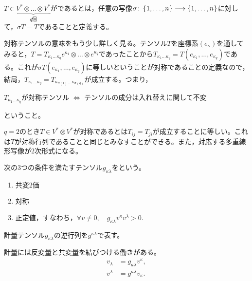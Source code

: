 \documentclass[uplatex]{jsarticle}
\begin{document}
\begin{teigi}[対称テンソル]
  $T \in \underbrace{V^{*} \otimes \dots \otimes V^{*}}_{q\text{個}}$がであるとは，任意の写像$\sigma \colon \Set{\hspace{-1.8pt} 1,\dots,n \hspace{-1.8pt}} \longrightarrow \Set{\hspace{-1.8pt} 1,\dots,n \hspace{-1.8pt}}$に対して，$\sigma T = T$であることと定義する。
\end{teigi}

対称テンソルの意味をもう少し詳しく見る。テンソル$T$を座標系$(e_{\kappa})$を通してみると，$T = T_{\kappa_{1} \dots \kappa_{q}} e^{\kappa_{1}} \otimes \dots \otimes e^{\kappa_{q}}$であったことから$T_{\kappa_{1} \dots \kappa_{q}} = T(e_{\kappa_{1}}, \dots, e_{\kappa_{q}})$である。これが$\sigma T (e_{\kappa_{1}}, \dots, e_{\kappa_{q}})$に等しいということが対称であることの定義なので，結局，$T_{\kappa_{1} \dots \kappa_{q}} = T_{\kappa_{\sigma(1)}\dots \kappa_{\sigma(q)}}$が成立する。つまり，
\begin{center}
  $T_{\kappa_{1}\dots\kappa_{q}}$が対称テンソル $\iff$ テンソルの成分は入れ替えに関して不変
\end{center}
ということ。

\begin{rei}
  $q = 2$のとき$T \in V^{*} \otimes V^{*}$が対称であるとは$T_{ij} = T_{ji}$が成立することに等しい。これは$T$が対称行列であることと同じとみなすことができる。また，対応する多重線形写像が2次形式になる。
\end{rei}


\sukima{}\par
\begin{teigi}[計量テンソル]
  次の3つの条件を満たすテンソル$g_{\kappa\lambda}$をという。
  \begin{enumerate}
    \item 共変2価
    \item 対称
    \item 正定値，すなわち，$\forall v \neq 0, \quad g_{\kappa\lambda}v^{\kappa}v^{\lambda} > 0.$
  \end{enumerate}
\end{teigi}

\begin{teigi}
  計量テンソル$g_{\kappa\lambda}$の逆行列を$g^{\kappa\lambda}$で表す。
\end{teigi}

\begin{remark}
  計量には反変量と共変量を結びつける働きがある。
  \begin{align}
    v_{\lambda} &= g_{\kappa \lambda} v^{\kappa}, \\
    v^{\lambda} &= g^{\kappa \lambda} v_{\kappa}.
  \end{align}
\end{remark}
\end{document}

